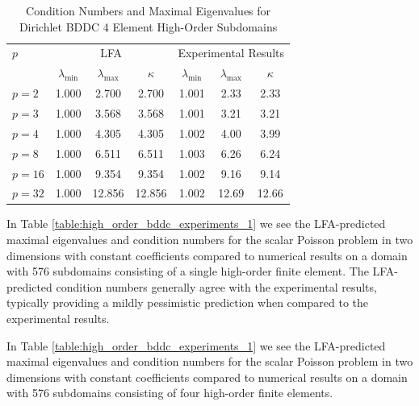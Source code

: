 \begin{table}[ht!]
\begin{center}
\begin{tabular}{l ccc ccc}
  \toprule
  $p$  &  \multicolumn{3}{c}{LFA}  &  \multicolumn{3}{c}{Experimental Results}  \\
                      &  $\lambda_{\text{min}}$  &  $\lambda_{\text{max}}$  &  $\kappa$ & $\lambda_{\text{min}}$  &  $\lambda_{\text{max}}$ & $\kappa$  \\
  \toprule
  $p = 2$   &  1.000  &   2.700  &   2.700  &  1.001  &   2.33  &   2.33  \\
  $p = 3$   &  1.000  &   3.568  &   3.568  &  1.001  &   3.21  &   3.21  \\
  $p = 4$   &  1.000  &   4.305  &   4.305  &  1.002  &   4.00  &   3.99  \\
  $p = 8$   &  1.000  &   6.511  &   6.511  &  1.003  &   6.26  &   6.24  \\
  $p = 16$  &  1.000  &   9.354  &   9.354  &  1.002  &   9.16  &   9.14  \\
  $p = 32$  &  1.000  &  12.856  &  12.856  &  1.002  &  12.69  &  12.66  \\
  \bottomrule
\end{tabular}
\end{center}
\caption{Condition Numbers and Maximal Eigenvalues for Dirichlet BDDC 4 Element High-Order Subdomains}
\label{table:high_order_bddc_experiments_2}
\end{table}

In Table \ref{table:high_order_bddc_experiments_1} we see the LFA-predicted maximal eigenvalues and condition numbers for the scalar Poisson problem in two dimensions with constant coefficients compared to numerical results on a domain with 576 subdomains consisting of a single high-order finite element.
The LFA-predicted condition numbers generally agree with the experimental results, typically providing a mildly pessimistic prediction when compared to the experimental results.

In Table \ref{table:high_order_bddc_experiments_1} we see the LFA-predicted maximal eigenvalues and condition numbers for the scalar Poisson problem in two dimensions with constant coefficients compared to numerical results on a domain with 576 subdomains consisting of four high-order finite elements.
